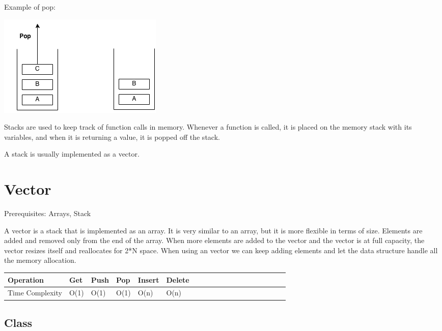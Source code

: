 \documentclass[11pt,oneside]{book}
\makeatletter
\def\maxwidth#1{\ifdim\Gin@nat@width>#1 #1\else\Gin@nat@width\fi}
\makeatother
\begin{document}
Example of pop:

\vspace{5px}\includegraphics[width=\maxwidth{\textwidth}]{stack2.png}

Stacks are used to keep track of function calls in memory. Whenever a function is called, it is placed on the memory stack with its variables, and when it is returning a value, it is popped off the stack.

A stack is usually implemented as a vector.


        \section{ Vector }
        

Prerequisites: Arrays, Stack



A vector is a stack that is implemented as an array. It is very similar to an array, but it is more flexible in terms of size. Elements are added and removed only from the end of the array. When more elements are added to the vector and the vector is at full capacity, the vector resizes itself and reallocates for 2*N space. When using an vector we can keep adding elements and let the data structure handle all the memory allocation.

\vspace{10px}\begin{tabulary}{0.4\linewidth}{|l|l|l|l|l|l|l|l|l|l|l|l|l|l|l|l|l|l|l}\hline


  Operation &
  Get &
  Push &
  Pop &
  Insert &
  Delete\\
\hline


  Time Complexity &
  O(1) &
  O(1) &
  O(1) &
  O(n) &
  O(n)\\

\hline\end{tabulary}

\subsection{Class}
\end{document}
